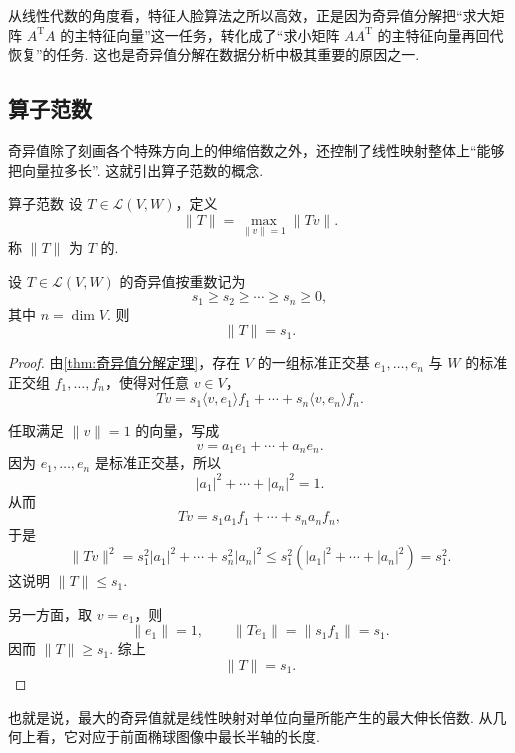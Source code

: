 从线性代数的角度看，特征人脸算法之所以高效，正是因为奇异值分解把“求大矩阵 $A^{\mathrm{T}}A$ 的主特征向量”这一任务，转化成了“求小矩阵 $AA^{\mathrm{T}}$ 的主特征向量再回代恢复”的任务. 这也是奇异值分解在数据分析中极其重要的原因之一.

\subsection{算子范数}

奇异值除了刻画各个特殊方向上的伸缩倍数之外，还控制了线性映射整体上“能够把向量拉多长”. 这就引出算子范数的概念.

\begin{definition}{算子范数}{} 
    设 $T \in \mathcal{L}(V, W)$，定义
    \[
        \lVert T \rVert = \max_{\lVert v \rVert = 1}\lVert Tv \rVert.
    \]
    称 $\lVert T \rVert$ 为 $T$ 的.
\end{definition}

\begin{theorem}{}{}
    设 $T \in \mathcal{L}(V, W)$ 的奇异值按重数记为
    \[
        s_1 \geqslant s_2 \geqslant \cdots \geqslant s_n \geqslant 0,
    \]
    其中 $n = \dim V$. 则
    \[
        \lVert T \rVert = s_1.
    \]
\end{theorem}

\begin{proof}
    由\autoref{thm:奇异值分解定理}，存在 $V$ 的一组标准正交基 $e_1, \ldots, e_n$ 与 $W$ 的标准正交组 $f_1, \ldots, f_n$，使得对任意 $v \in V$，
    \[
        Tv = s_1 \langle v, e_1 \rangle f_1 + \cdots + s_n \langle v, e_n \rangle f_n.
    \]

    任取满足 $\lVert v \rVert = 1$ 的向量，写成
    \[
        v = a_1e_1 + \cdots + a_ne_n.
    \]
    因为 $e_1, \ldots, e_n$ 是标准正交基，所以
    \[
        |a_1|^2 + \cdots + |a_n|^2 = 1.
    \]
    从而
    \[
        Tv = s_1a_1f_1 + \cdots + s_na_nf_n,
    \]
    于是
    \[
        \lVert Tv \rVert^2 = s_1^2|a_1|^2 + \cdots + s_n^2|a_n|^2 \leqslant s_1^2(|a_1|^2 + \cdots + |a_n|^2) = s_1^2.
    \]
    这说明 $\lVert T \rVert \leqslant s_1$.

    另一方面，取 $v = e_1$，则
    \[
        \lVert e_1 \rVert = 1,\qquad \lVert Te_1 \rVert = \lVert s_1f_1 \rVert = s_1.
    \]
    因而 $\lVert T \rVert \geqslant s_1$. 综上
    \[
        \lVert T \rVert = s_1.
    \]
\end{proof}

也就是说，最大的奇异值就是线性映射对单位向量所能产生的最大伸长倍数. 从几何上看，它对应于前面椭球图像中最长半轴的长度.

